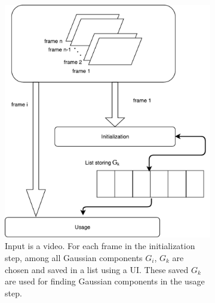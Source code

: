 \begin{figure}[!hbpt]
\centering
        \begin{subfigure}{0.45\textwidth}
            \includegraphics[width=\textwidth]{figures/detection/init_and_usage.pdf}           
            \caption{Input is a video. For each frame in the initialization step, among all Gaussian components $G_i$, $G_k$ are chosen and saved in a list using a UI. These saved $G_k$ are used for finding Gaussian components in the usage step.}
             \label{fig:init_and_usage}
         \end{subfigure}\hspace{2cm} \begin{subfigure}{0.4\textwidth}

\end{subfigure}
\end{figure}
